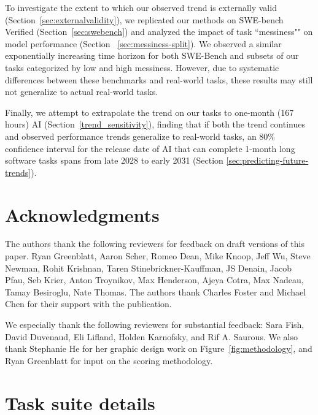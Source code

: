 \documentclass{article}
\begin{document}
To investigate the extent to which our observed trend is externally valid (Section~\ref{sec:externalvalidity}), we replicated our methods on SWE-bench Verified (Section~\ref{sec:swebench}) and analyzed the impact of task ``messiness"" on model performance (Section ~\ref{sec:messiness-split}). We observed a similar exponentially increasing time horizon for both SWE-Bench and subsets of our tasks categorized by low and high messiness. However, due to systematic differences between these benchmarks and real-world tasks, these results may still not generalize to actual real-world tasks.

Finally, we attempt to extrapolate the trend on our tasks to one-month (167 hours) AI (Section~\ref{trend_sensitivity}), finding that {if both the trend continues and observed performance trends generalize to real-world tasks}, an 80\% confidence interval for the release date of AI that can complete 1-month long software tasks spans from late 2028 to early 2031 (Section \ref{sec:predicting-future-trends}).

\section*{Acknowledgments}

The authors thank the following reviewers for feedback on draft versions of this paper. Ryan Greenblatt, Aaron Scher, Romeo Dean, Mike Knoop, Jeff Wu, Steve Newman, Rohit Krishnan, Taren Stinebrickner-Kauffman, JS Denain, Jacob Pfau, Seb Krier, Anton Troynikov, Max Henderson,  Ajeya Cotra, Max Nadeau, Tamay Besiroglu, Nate Thomas. The authors thank Charles Foster and Michael Chen for their support with the publication.

We especially thank the following reviewers for substantial feedback: Sara Fish, David Duvenaud, Eli Lifland, Holden Karnofsky, and Rif A. Saurous.
We also thank Stephanie He for her graphic design work on Figure~\ref{fig:methodology}, and Ryan Greenblatt for input on the scoring methodology. 

\newpage 




\newpage
\appendix

\section{Task suite details}
\end{document}
